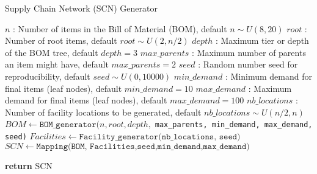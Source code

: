 \documentclass{article}
\begin{document}
	
	\begin{algorithm}
		\caption{Supply Chain Network (SCN) Generator}
		\begin{algorithmic}[1]
			
			\State $n$ : Number of items in the Bill of Material (BOM), default $n \sim U(8, 20)$
			\State $root$ : Number of root items, default $root \sim U(2, n/2)$
			\State $depth$ : Maximum tier or depth of the BOM tree, default $depth = 3$
			\State $max\_parents$ : Maximum number of parents an item might have, default $max\_parents = 2$
			\State $seed$ : Random number seed for reproducibility, default $seed \sim U(0, 10000)$
			\State $min\_demand$ : Minimum demand for final items (leaf nodes), default $min\_demand = 10$
			\State $max\_demand$ : Maximum demand for final items (leaf nodes), default $max\_demand = 100$
			\State $nb\_locations$ : Number of facility locations to be generated, default $nb\_locations \sim U(n/2, n)$
			\State $BOM \gets \texttt{BOM\_generator(}n, root, depth,$
			\Statex \hspace{1.5em} \texttt{max\_parents, min\_demand, max\_demand, seed)}
			\State $Facilities \gets \texttt{Facility\_generator(nb\_locations, seed)}$
			\State $SCN \gets \texttt{Mapping(BOM, Facilities,seed,min\_demand,max\_demand)}$
			
			\Statex
			\State \textbf{return} SCN
			
		\end{algorithmic}
	\end{algorithm}
	
\end{document}
